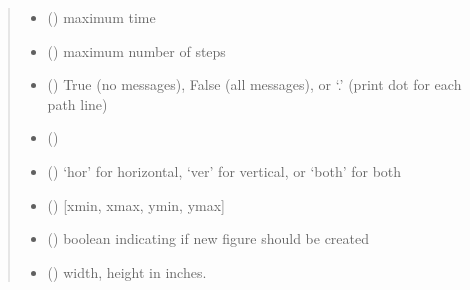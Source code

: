 \documentclass[letterpaper,10pt,english]{sphinxmanual}
\begin{document}
\begin{fulllineitems}
\begin{fulllineitems}
\begin{quote}
\begin{description}
\begin{itemize}
\item {} 
 () \textendash{} maximum time

\item {} 
 (\sphinxstyleliteralemphasis{(}\sphinxstyleliteralemphasis{)}) \textendash{} maximum number of steps

\item {} 
 () \textendash{} True (no messages), False (all messages), or ‘.’
(print dot for each path line)

\item {} 
 () \textendash{} 

\item {} 
 () \textendash{} ‘hor’ for horizontal, ‘ver’ for vertical, or ‘both’ for both

\item {} 
 (\sphinxstyleliteralemphasis{ (}\sphinxstyleliteralemphasis{)}) \textendash{} {[}xmin, xmax, ymin, ymax{]}

\item {} 
 (\sphinxstyleliteralemphasis{ (}\sphinxstyleliteralemphasis{)}) \textendash{} boolean indicating if new figure should be created

\item {} 
 (\sphinxstyleliteralemphasis{, }\sphinxstyleliteralemphasis{, }) \textendash{} width, height in inches.

\end{itemize}

\end{description}\end{quote}

\end{fulllineitems}


\end{fulllineitems}
\end{document}
